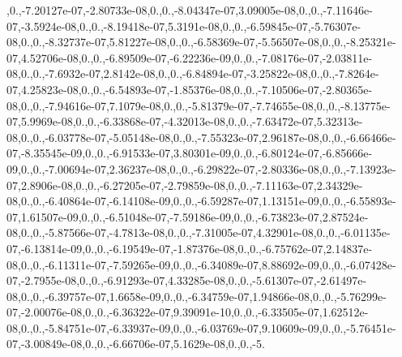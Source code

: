 {,0.,-\/7.\-20127e-\/07,-\/2.\-80733e-\/08,0.,0.,-\/8.\-04347e-\/07,3.\-09005e-\/08,0.,0.,-\/7.\-11646e-\/07,-\/3.\-5924e-\/08,0.,0.,-\/8.\-19418e-\/07,5.\-3191e-\/08,0.,0.,-\/6.\-59845e-\/07,-\/5.\-76307e-\/08,0.,0.,-\/8.\-32737e-\/07,5.\-81227e-\/08,0.,0.,-\/6.\-58369e-\/07,-\/5.\-56507e-\/08,0.,0.,-\/8.\-25321e-\/07,4.\-52706e-\/08,0.,0.,-\/6.\-89509e-\/07,-\/6.\-22236e-\/09,0.,0.,-\/7.\-08176e-\/07,-\/2.\-03811e-\/08,0.,0.,-\/7.\-6932e-\/07,2.\-8142e-\/08,0.,0.,-\/6.\-84894e-\/07,-\/3.\-25822e-\/08,0.,0.,-\/7.\-8264e-\/07,4.\-25823e-\/08,0.,0.,-\/6.\-54893e-\/07,-\/1.\-85376e-\/08,0.,0.,-\/7.\-10506e-\/07,-\/2.\-80365e-\/08,0.,0.,-\/7.\-94616e-\/07,7.\-1079e-\/08,0.,0.,-\/5.\-81379e-\/07,-\/7.\-74655e-\/08,0.,0.,-\/8.\-13775e-\/07,5.\-9969e-\/08,0.,0.,-\/6.\-33868e-\/07,-\/4.\-32013e-\/08,0.,0.,-\/7.\-63472e-\/07,5.\-32313e-\/08,0.,0.,-\/6.\-03778e-\/07,-\/5.\-05148e-\/08,0.,0.,-\/7.\-55323e-\/07,2.\-96187e-\/08,0.,0.,-\/6.\-66466e-\/07,-\/8.\-35545e-\/09,0.,0.,-\/6.\-91533e-\/07,3.\-80301e-\/09,0.,0.,-\/6.\-80124e-\/07,-\/6.\-85666e-\/09,0.,0.,-\/7.\-00694e-\/07,2.\-36237e-\/08,0.,0.,-\/6.\-29822e-\/07,-\/2.\-80336e-\/08,0.,0.,-\/7.\-13923e-\/07,2.\-8906e-\/08,0.,0.,-\/6.\-27205e-\/07,-\/2.\-79859e-\/08,0.,0.,-\/7.\-11163e-\/07,2.\-34329e-\/08,0.,0.,-\/6.\-40864e-\/07,-\/6.\-14108e-\/09,0.,0.,-\/6.\-59287e-\/07,1.\-13151e-\/09,0.,0.,-\/6.\-55893e-\/07,1.\-61507e-\/09,0.,0.,-\/6.\-51048e-\/07,-\/7.\-59186e-\/09,0.,0.,-\/6.\-73823e-\/07,2.\-87524e-\/08,0.,0.,-\/5.\-87566e-\/07,-\/4.\-7813e-\/08,0.,0.,-\/7.\-31005e-\/07,4.\-32901e-\/08,0.,0.,-\/6.\-01135e-\/07,-\/6.\-13814e-\/09,0.,0.,-\/6.\-19549e-\/07,-\/1.\-87376e-\/08,0.,0.,-\/6.\-75762e-\/07,2.\-14837e-\/08,0.,0.,-\/6.\-11311e-\/07,-\/7.\-59265e-\/09,0.,0.,-\/6.\-34089e-\/07,8.\-88692e-\/09,0.,0.,-\/6.\-07428e-\/07,-\/2.\-7955e-\/08,0.,0.,-\/6.\-91293e-\/07,4.\-33285e-\/08,0.,0.,-\/5.\-61307e-\/07,-\/2.\-61497e-\/08,0.,0.,-\/6.\-39757e-\/07,1.\-6658e-\/09,0.,0.,-\/6.\-34759e-\/07,1.\-94866e-\/08,0.,0.,-\/5.\-76299e-\/07,-\/2.\-00076e-\/08,0.,0.,-\/6.\-36322e-\/07,9.\-39091e-\/10,0.,0.,-\/6.\-33505e-\/07,1.\-62512e-\/08,0.,0.,-\/5.\-84751e-\/07,-\/6.\-33937e-\/09,0.,0.,-\/6.\-03769e-\/07,9.\-10609e-\/09,0.,0.,-\/5.\-76451e-\/07,-\/3.\-00849e-\/08,0.,0.,-\/6.\-66706e-\/07,5.\-1629e-\/08,0.,0.,-\/5.}
